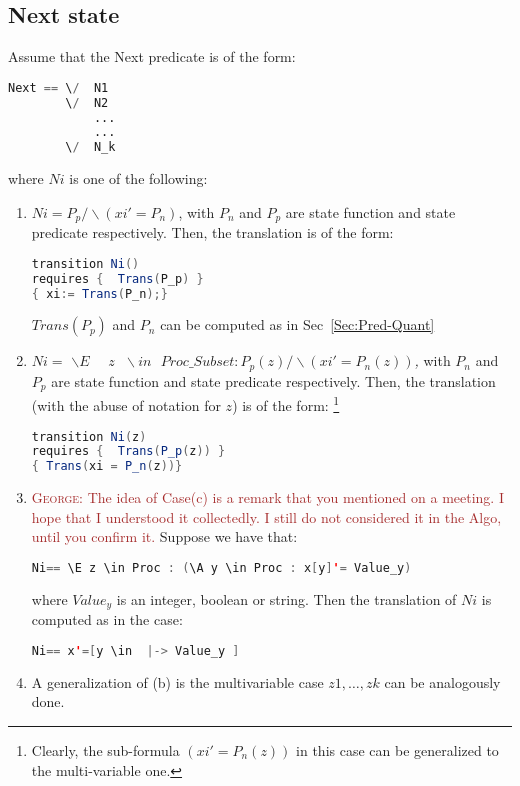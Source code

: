 \documentclass{article}
\theoremstyle{plain}
\numberwithin{equation}{section}
\newcommand{\george}[1]{\textcolor{brown}{\textsc{George: } {\sf #1}}}
\begin{document}
 


\subsection{Next state} 

Assume that the Next predicate is of the form: 

\begin{lstlisting}[language=Python]
Next == \/  N1 
        \/  N2 
            ...
            ...
        \/  N_k 
\end{lstlisting}

where $Ni$ is one of the following: 
\begin{enumerate}
\item $Ni= P_p /\backslash (xi'=P_n)$, with $P_n$ and $P_p$ are state function and state predicate respectively.  Then, the translation is of the form: 
\begin{lstlisting}[language=Java]
transition Ni() 
requires {  Trans(P_p) }
{ xi:= Trans(P_n);}

\end{lstlisting}

$Trans(P_p)$  and $P_n$  can be computed as in Sec~\ref{Sec:Pred-Quant}




\item $Ni=$ \emph{$\backslash E \text{ } \text{ }z \text{ } \backslash in \text{ } Proc\_Subset: P_p(z) /\backslash (xi'=P_n(z))$,} 
 with $P_n$ and $P_p$ are state function and state predicate respectively. Then, the translation (with the abuse of notation for $z$) is of the form: \footnote{Clearly, the sub-formula $(xi'=P_n(z))$ in this case can be generalized to the multi-variable one. }
\begin{lstlisting}[language=Java]
transition Ni(z) 
requires {  Trans(P_p(z)) }
{ Trans(xi = P_n(z))}
\end{lstlisting}




\item \george{The idea of Case(c) is a remark that you mentioned on a meeting. I hope that I understood it collectedly. I still do not considered it in the Algo, until you confirm it.  }Suppose we have that: 
\begin{lstlisting}[language=Java] 
Ni== \E z \in Proc : (\A y \in Proc : x[y]'= Value_y)
\end{lstlisting}
where $Value_y$ is an integer, boolean or string.  Then the translation of $Ni$ is computed as in the case: 
\begin{lstlisting}[language=Java] 
Ni== x'=[y \in  |-> Value_y ]
\end{lstlisting}

\color{blue}
\item A generalization of (b) is the multivariable case $z1, \dots, zk$ can be analogously done. 
\color{black}

\end{enumerate}
\end{document}
